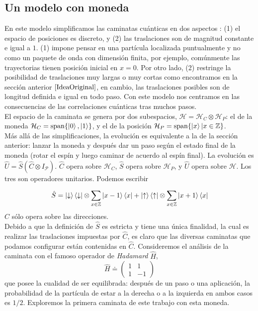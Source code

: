 \subsection{Un modelo con moneda}\label{sec:LineaInfinita}
En este modelo simplificamos las caminatas cuánticas en dos aspectos\cite{kempe2003quantum} : (1) el espacio de posiciones es discreto, y (2) las traslaciones son de magnitud constante e igual a $1$. (1) impone pensar en una partícula localizada puntualmente y no como un paquete de onda con dimensión finita, por ejemplo, comúnmente las trayectorias tienen posición inicial en $x=0$. 
Por otro lado, (2) restringe la posibilidad de traslaciones muy largas o muy cortas como encontramos en la sección anterior $\ref{IdeaOriginal}$, en cambio, las traslaciones posibles son de longitud definida e igual en todo paso. Con este modelo nos centramos en las consecuencias de las correlaciones cuánticas tras muchos pasos.\\

El espacio de la caminata se genera por dos subespacios, $\mathcal{H}=\mathcal{H}_C\otimes\mathcal{H}_P$: el de la moneda
$\mathcal{H}_C=\text{span}\{\ket{0},\ket{1}\}$, y el de la posición $\mathcal{H}_P=\text{span}\{\ket{x}|x\in \mathbb{Z}\}$. \\

Más allá de las simplificaciones, la evolución es equivalente a la de la sección anterior: lanzar la moneda y después dar un paso según el estado final de la moneda (rotar el espín y luego caminar de acuerdo al espín final). 
La evolución es $\hat{U}=\hat{S}(\hat{C}\otimes I_{\mathcal{P}})$. $\hat{C}$ opera sobre $\mathcal{H}_C$,  $\hat{S}$ opera sobre $\mathcal{H}_P$, y $\hat{U}$ opera sobre $\mathcal{H}$. Los tres son operadores unitarios.
Podemos escribir

\begin{equation}
\hat{S}=\ket{\downarrow}\bra{\downarrow}\otimes \sum_{x\in \mathbb{Z}}\ket{x-1}\bra{x}+\ket{\uparrow}\bra{\uparrow}\otimes \sum_{x\in \mathbb{Z}}\ket{x+1}\bra{x}
\end{equation}{}
$\hat{C}$ sólo opera sobre las direcciones.\\

Debido a que la definición de $\hat{S}$ es estricta y tiene una única finalidad, la cual es realizar las traslaciones impuestas por $\hat{C}$, es claro que las diversas caminatas que podamos configurar están contenidas en $\hat{C}$. 
Consideremos el análisis de la caminata con el famoso operador de \textit{Hadamard} $\hat{H}$, 
\begin{equation*}
\hat{H}\doteq
\begin{pmatrix}
1 & 1\\
1 & -1
\end{pmatrix}
\end{equation*}{}
que posee la cualidad de ser equilibrada: después de un paso o una aplicación, la probabilidad de la partícula de estar a la derecha o a la izquierda en ambos casos es $1/2$. Exploremos la primera caminata de este trabajo con esta moneda.\\

